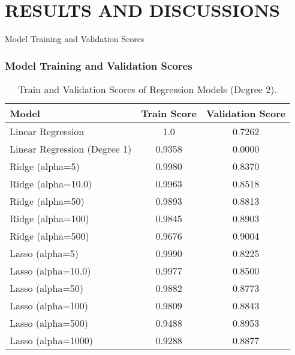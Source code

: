 \section{RESULTS AND DISCUSSIONS}
\label{results_and_discussions_section}


\begin{frame}{Model Training and Validation Scores}
    \frametitle{Model Training and Validation Scores}
    \begin{table}[H]
        \centering
        \tiny %
        \begin{tabular}{|l|c|c|}
        \hline
        \textbf{Model} & \textbf{Train Score} & \textbf{Validation Score} \\
        \hline
        Linear Regression & 1.0 & 0.7262 \\
        Linear Regression (Degree 1) & 0.9358 & 0.0000 \\
        Ridge (alpha=5) & 0.9980 & 0.8370 \\
        Ridge (alpha=10.0) & 0.9963 & 0.8518 \\
        Ridge (alpha=50) & 0.9893 & 0.8813 \\
        Ridge (alpha=100) & 0.9845 & 0.8903 \\
        \rowcolor{yellow} %
        Ridge (alpha=500) & 0.9676 & 0.9004 \\
        Lasso (alpha=5) & 0.9990 & 0.8225 \\
        Lasso (alpha=10.0) & 0.9977 & 0.8500 \\
        Lasso (alpha=50) & 0.9882 & 0.8773 \\
        Lasso (alpha=100) & 0.9809 & 0.8843 \\
        Lasso (alpha=500) & 0.9488 & 0.8953 \\
        Lasso (alpha=1000) & 0.9288 & 0.8877 \\
        \hline
        \end{tabular}
        \caption{Train and Validation Scores of Regression Models (Degree 2).}
        \label{tab:model_scores}
    \end{table}
\end{frame}

